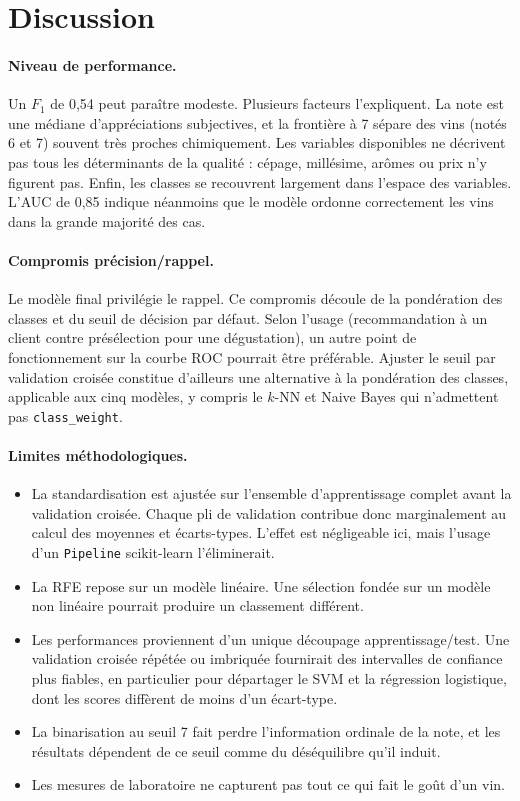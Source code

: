 \documentclass[11pt,a4paper]{article}
\newcommand{\code}[1]{\texttt{#1}}
\newcommand{\Fun}{F_1}
\begin{document}
\section{Discussion}\label{sec:discussion}

\paragraph{Niveau de performance.} Un $\Fun$ de 0,54 peut paraître modeste. Plusieurs facteurs l'expliquent. La note est une médiane d'appréciations subjectives, et la frontière à 7 sépare des vins (notés 6 et 7) souvent très proches chimiquement. Les variables disponibles ne décrivent pas tous les déterminants de la qualité : cépage, millésime, arômes ou prix n'y figurent pas. Enfin, les classes se recouvrent largement dans l'espace des variables. L'AUC de 0,85 indique néanmoins que le modèle ordonne correctement les vins dans la grande majorité des cas.

\paragraph{Compromis précision/rappel.} Le modèle final privilégie le rappel. Ce compromis découle de la pondération des classes et du seuil de décision par défaut. Selon l'usage (recommandation à un client contre présélection pour une dégustation), un autre point de fonctionnement sur la courbe ROC pourrait être préférable. Ajuster le seuil par validation croisée constitue d'ailleurs une alternative à la pondération des classes, applicable aux cinq modèles, y compris le $k$-NN et Naive Bayes qui n'admettent pas \code{class\_weight}.

\paragraph{Limites méthodologiques.}
\begin{itemize}
  \item La standardisation est ajustée sur l'ensemble d'apprentissage complet avant la validation croisée. Chaque pli de validation contribue donc marginalement au calcul des moyennes et écarts-types. L'effet est négligeable ici, mais l'usage d'un \code{Pipeline} scikit-learn l'éliminerait.
  \item La RFE repose sur un modèle linéaire. Une sélection fondée sur un modèle non linéaire pourrait produire un classement différent.
  \item Les performances proviennent d'un unique découpage apprentissage/test. Une validation croisée répétée ou imbriquée fournirait des intervalles de confiance plus fiables, en particulier pour départager le SVM et la régression logistique, dont les scores diffèrent de moins d'un écart-type.
  \item La binarisation au seuil 7 fait perdre l'information ordinale de la note, et les résultats dépendent de ce seuil comme du déséquilibre qu'il induit.
  \item Les mesures de laboratoire ne capturent pas tout ce qui fait le goût d'un vin.
\end{itemize}
\end{document}
